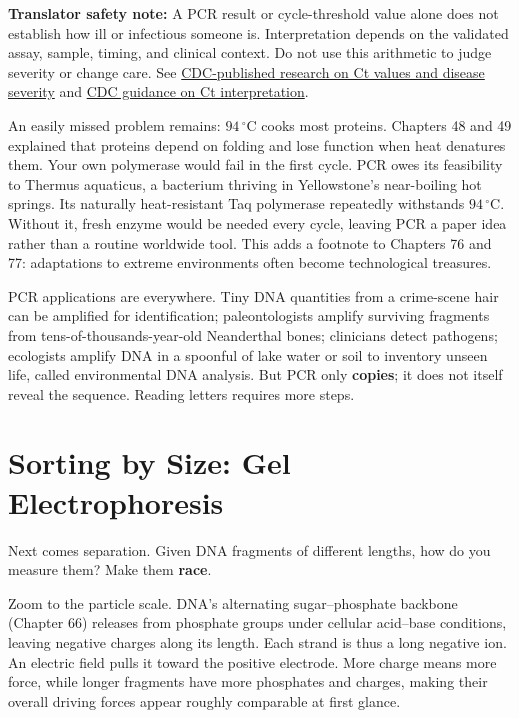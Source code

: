 \textbf{Translator safety note:} A PCR result or cycle-threshold value alone does not establish how ill or infectious someone is. Interpretation depends on the validated assay, sample, timing, and clinical context. Do not use this arithmetic to judge severity or change care. See \href{https://wwwnc.cdc.gov/eid/article/30/6/23-1427_article}{CDC-published research on Ct values and disease severity} and \href{https://www.cdc.gov/mmwr/volumes/71/wr/mm7136a3.htm}{CDC guidance on Ct interpretation}.

An easily missed problem remains: $94\,^{\circ}\mathrm{C}$ cooks most proteins. Chapters 48 and 49 explained that proteins depend on folding and lose function when heat denatures them. Your own polymerase would fail in the first cycle. PCR owes its feasibility to Thermus aquaticus, a bacterium thriving in Yellowstone's near-boiling hot springs. Its naturally heat-resistant Taq polymerase repeatedly withstands $94\,^{\circ}\mathrm{C}$. Without it, fresh enzyme would be needed every cycle, leaving PCR a paper idea rather than a routine worldwide tool. This adds a footnote to Chapters 76 and 77: adaptations to extreme environments often become technological treasures.

PCR applications are everywhere. Tiny DNA quantities from a crime-scene hair can be amplified for identification; paleontologists amplify surviving fragments from tens-of-thousands-year-old Neanderthal bones; clinicians detect pathogens; ecologists amplify DNA in a spoonful of lake water or soil to inventory unseen life, called environmental DNA analysis. But PCR only \textbf{copies}; it does not itself reveal the sequence. Reading letters requires more steps.

\section{Sorting by Size: Gel Electrophoresis}

Next comes separation. Given DNA fragments of different lengths, how do you measure them? Make them \textbf{race}.

Zoom to the particle scale. DNA's alternating sugar--phosphate backbone (Chapter 66) releases  from phosphate groups under cellular acid--base conditions, leaving negative charges along its length. Each strand is thus a long negative ion. An electric field pulls it toward the positive electrode. More charge means more force, while longer fragments have more phosphates and charges, making their overall driving forces appear roughly comparable at first glance.

